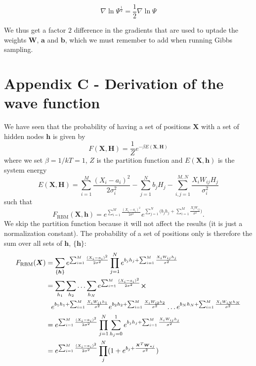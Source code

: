 \documentclass[norsk,a4paper,12pt]{article}
\begin{document}
\begin{equation}
	\nabla \ln \Psi^{\frac{1}{2}} = \frac{1}{2} \nabla \ln \Psi
\end{equation}

We thus get a factor $2$ difference in the gradients that are used to uptade the weights $\boldsymbol{W}$, $\boldsymbol{a}$ and $\boldsymbol{b}$, which we must remember to add when running Gibbs sampling.

\section{Appendix C - Derivation of the wave function}
We have seen that the probability of having a set of positions $\boldsymbol{X}$ with a set of hidden nodes $\boldsymbol{h}$ is given by
\begin{equation}
F(\boldsymbol{X},\boldsymbol{H})=\frac{1}{Z}e^{-\beta E(\boldsymbol{X},\boldsymbol{H})}
\end{equation}
where we set $\beta=1/kT=1$, $Z$ is the partition function and $E(\boldsymbol{X},\boldsymbol{h})$ is the system energy
\begin{equation}
E(\boldsymbol{X},\boldsymbol{H})=\sum_{i=1}^{M}\frac{(X_i-a_i)^2}{2\sigma_i^2}-\sum_{j=1}^Nb_jH_j-\sum_{i,j=1}^{M,N}\frac{X_iW_{ij}H_j}{\sigma_i^2}
\end{equation}
such that
\begin{equation}
F_{\text{RBM}}(\boldsymbol{X},\boldsymbol{h})=e^{\sum_{i=1}^M \frac{(X_i - a_i)^2}{2\sigma^2}} e^{\sum_{j=1}^N\Big(b_jh_j+\sum_{i=1}^M\frac{X_iW_{ij}}{\sigma^2}\Big)}.
\end{equation}
We skip the partition function because it will not affect the results (it is just a normalization constant). The probability of a set of positions only is therefore the sum over all sets of $\boldsymbol{h}$, $\{\boldsymbol{h}\}$:
\begin{align}
F_{\text{RBM}}(\boldsymbol{X})&=\sum_{\{\boldsymbol{h}\}}e^{\sum_{i=1}^M \frac{(X_i - a_i)^2}{2\sigma^2}} \prod_{j=1}^Ne^{b_jh_j+\sum_{i=1}^M\frac{X_iW_{ij}h_j}{\sigma^2}}\notag\\
&=\sum_{h_1}\sum_{h_2}\hdots\sum_{h_N}e^{\sum_{i=1}^M \frac{(X_i - a_i)^2}{2\sigma^2}}\cross\notag\\
&\phantom{=}e^{b_1h_1+\sum_{i=1}^M\frac{X_iW_{i1}h_1}{\sigma^2}}e^{b_2h_2+\sum_{i=1}^M\frac{X_iW_{i2}h_2}{\sigma^2}}\hdots e^{b_Nh_N+\sum_{i=1}^M\frac{X_iW_{iN}h_N}{\sigma^2}}\notag\\
&=e^{\sum_{i=1}^M \frac{(X_i - a_i)^2}{2\sigma^2}}\prod_{j=1}^N\sum_{h_j=0}^1e^{b_jh_j+\sum_{i=1}^M \frac{X_i W_{ij}h_j}{\sigma^2}}\notag\\
&=e^{\sum_{i=1}^M \frac{(X_i - a_i)^2}{2\sigma^2}} \prod_j^N (1+ e^{b_j + \frac{\boldsymbol{X}^T\boldsymbol{W}_{*j}}{\sigma^2}})
\end{align}
\end{document}
